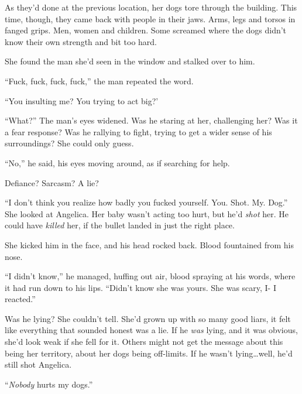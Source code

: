 As they'd done at the previous location, her dogs tore through the building.  This time, though, they came back with people in their jaws.  Arms, legs and torsos in fanged grips.  Men, women and children.  Some screamed where the dogs didn't know their own strength and bit too hard.



She found the man she'd seen in the window and stalked over to him.



``Fuck, fuck, fuck, fuck,'' the man repeated the word.



``You insulting me?  You trying to act big?'



``What?''  The man's eyes widened.  Was he staring at her, challenging her?  Was it a fear response?  Was he rallying to fight, trying to get a wider sense of his surroundings?  She could only guess.



``No,'' he said, his eyes moving around, as if searching for help.



Defiance?  Sarcasm?  A lie?



``I don't think you realize how badly you fucked yourself.  You.  Shot.  My.  Dog.''  She looked at Angelica.  Her baby wasn't acting too hurt, but he'd \emph{shot} her.  He could have \emph{killed} her, if the bullet landed in just the right place.



She kicked him in the face, and his head rocked back.  Blood fountained from his nose.



``I didn't know,'' he managed, huffing out air, blood spraying at his words, where it had run down to his lips.  ``Didn't know she was yours.  She was scary, I- I reacted.''



Was he lying?  She couldn't tell.  She'd grown up with so many good liars, it felt like everything that sounded honest was a lie.  If he \emph{was} lying, and it was obvious, she'd look weak if she fell for it.  Others might not get the message about this being her territory, about her dogs being off-limits.  If he wasn't lying\ldots well, he'd still shot Angelica.



``\emph{Nobody} hurts my dogs.''



